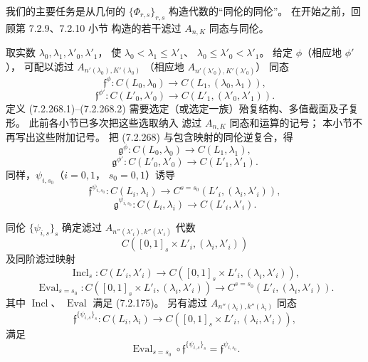 我们的主要任务是从几何的
$\{\Phi_{r,s}\}_{r,s}$
构造代数的“同伦的同伦”。
在开始之前，回顾第 7.2.9、7.2.10 小节
构造的若干滤过 $A_{n,K}$ 同态与同伦。

取实数 $\lambda_0,\lambda_1,\lambda'_0,\lambda'_1$，
使
$\lambda_0<\lambda_1\le\lambda'_1$、
$\lambda_0\le\lambda'_0<\lambda'_1$。
给定 $\phi$（相应地 $\phi'$），
可配以滤过
$A_{n'(\lambda_0),K'(\lambda_0)}$
（相应地
$A_{n'(\lambda'_0),K'(\lambda'_0)}$）
同态
\begin{equation}
\mathfrak f^\phi\colon
C(L_0,\lambda_0)\longrightarrow
C(L_1,(\lambda_0,\lambda_1)),
\tag{7.2.268.1}\label{eq:7-2-268-1}
\end{equation}
\begin{equation}
\mathfrak f^{\phi'}\colon
C(L'_0,\lambda'_0)\longrightarrow
C(L'_1,(\lambda'_0,\lambda'_1)).
\tag{7.2.268.2}\label{eq:7-2-268-2}
\end{equation}
定义 (7.2.268.1)--(7.2.268.2)
需要选定（或选定一族）殆复结构、多值截面及子复形。
此前各小节已多次把这些选取纳入
滤过 $A_{n,K}$ 同态和运算的记号；
本小节不再写出这些附加记号。
把 (7.2.268) 与包含映射的同伦逆复合，得
\begin{equation}
\mathfrak g^\phi\colon
C(L_0,\lambda_0)\longrightarrow C(L_1,\lambda_1),
\tag{7.2.269.1}\label{eq:7-2-269-1}
\end{equation}
\begin{equation}
\mathfrak g^{\phi'}\colon
C(L'_0,\lambda'_0)\longrightarrow C(L'_1,\lambda'_1).
\tag{7.2.269.2}\label{eq:7-2-269-2}
\end{equation}
同样，$\psi_{i,s_0}$（$i=0,1$，
$s_0=0,1$）诱导
\begin{equation}
\mathfrak f^{\psi_{i,s_0}}\colon
C(L_i,\lambda_i)\longrightarrow
C^{s=s_0}(L'_i,(\lambda_i,\lambda'_i)),
\tag{7.2.270}\label{eq:7-2-270}
\end{equation}
\begin{equation}
\mathfrak g^{\psi_{i,s_0}}\colon
C(L_i,\lambda_i)\longrightarrow C(L'_i,\lambda'_i).
\tag{7.2.271}\label{eq:7-2-271}
\end{equation}

同伦 $\{\psi_{i,s}\}_s$
确定滤过 $A_{n''(\lambda'_i),k''(\lambda'_i)}$ 代数
\[
C([0,1]_s\times L'_i,(\lambda_i,\lambda'_i))
\]
及同阶滤过映射
\begin{equation}
\operatorname{Incl}_s\colon C(L'_i,\lambda'_i)
\longrightarrow
C([0,1]_s\times L'_i,(\lambda_i,\lambda'_i)),
\tag{7.2.272.1}\label{eq:7-2-272-1}
\end{equation}
\begin{equation}
\operatorname{Eval}_{s=s_0}\colon
C([0,1]_s\times L'_i,(\lambda_i,\lambda'_i))
\longrightarrow
C^{s=s_0}(L'_i,(\lambda_i,\lambda'_i)).
\tag{7.2.272.2}\label{eq:7-2-272-2}
\end{equation}
其中 $\operatorname{Incl}$、
$\operatorname{Eval}$ 满足 (7.2.175)。
另有滤过
$A_{n''(\lambda_i),k''(\lambda_i)}$
同态
\[
\mathfrak f^{\{\psi_{i,s}\}_s}\colon
C(L_i,\lambda_i)\longrightarrow
C([0,1]_s\times L'_i,(\lambda_i,\lambda'_i)),
\]
满足
\begin{equation}
\operatorname{Eval}_{s=s_0}
\circ\mathfrak f^{\{\psi_{i,s}\}_s}
=\mathfrak f^{\psi_{i,s_0}}.
\tag{7.2.273}\label{eq:7-2-273}
\end{equation}

